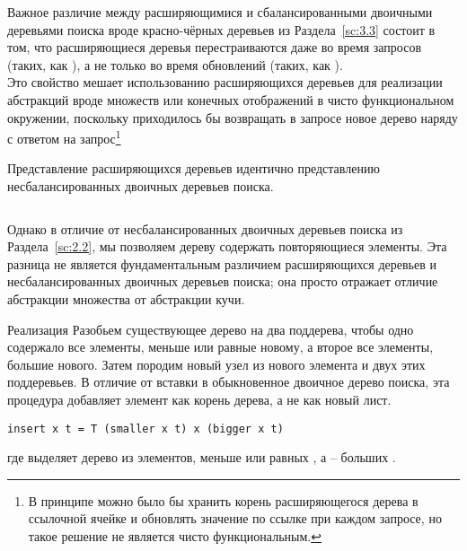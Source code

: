 \begin{frame}[fragile]{}
Важное различие между расширяющимися и сбалансированными
двоичными деревьями поиска вроде красно-чёрных деревьев из
Раздела~\ref{sc:3.3} состоит в том, что расширяющиеся деревья
перестраиваются даже во время запросов (таких, как ),
а не только во время обновлений (таких, как ). \\

Это
свойство мешает использованию расширяющихся деревьев для реализации
абстракций вроде множеств или конечных отображений в чисто
функциональном окружении, поскольку приходилось бы возвращать в
запросе новое дерево наряду с ответом на запрос\footnote{%
  В принципе можно было бы хранить корень расширяющегося дерева в
  ссылочной ячейке и обновлять значение по ссылке при каждом запросе, но
  такое решение не является чисто функциональным.
}
\end{frame}


\begin{frame}[fragile]{}
Представление расширяющихся деревьев идентично представлению
несбалансированных двоичных деревьев поиска.
\inputminted[firstline=5,lastline=5] {haskell}{code/SplayHeap.lhs}


Однако в отличие от несбалансированных двоичных деревьев поиска из
Раздела~\ref{sc:2.2}, мы позволяем дереву содержать повторяющиеся
элементы. Эта разница не является фундаментальным различием расширяющихся
деревьев и несбалансированных двоичных деревьев поиска; она просто
отражает отличие абстракции множества от абстракции кучи.

\end{frame}


\begin{frame}[fragile]{Реализация  }
Разобьем существующее дерево на два поддерева, чтобы одно содержало все
элементы, меньше или равные новому, а второе все элементы, большие
нового. Затем породим новый узел из нового элемента и двух этих
поддеревьев. В отличие от вставки в обыкновенное двоичное дерево
поиска, эта процедура добавляет элемент как корень дерева, а не как
новый лист.

\begin{verbatim}
insert x t = T (smaller x t) x (bigger x t)
\end{verbatim}

где  выделяет дерево из элементов, меньше или равных
, а  -- больших
. 

\end{frame}



